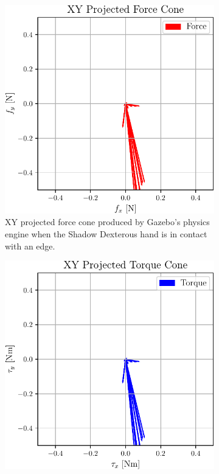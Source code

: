 \begin{figure}[!h]
	\centering
	\begin{subfigure}[b]{0.48\textwidth}
		\centering
		\includegraphics[width=\textwidth]{chapters/1-tactile-perception/fig/matplotlib/xy-projected-force-cones.pdf}
		\caption{XY projected force cone produced by Gazebo's physics engine when the Shadow Dexterous hand is in contact with an edge.}
		\label{fig:xy-projected-force-cones}
	\end{subfigure}
	\hfill
	\begin{subfigure}[b]{0.48\textwidth}
		\centering
		\includegraphics[width=\textwidth]{chapters/1-tactile-perception/fig/matplotlib/xy-projected-torque-cones.pdf}

\end{subfigure}
\end{figure}
